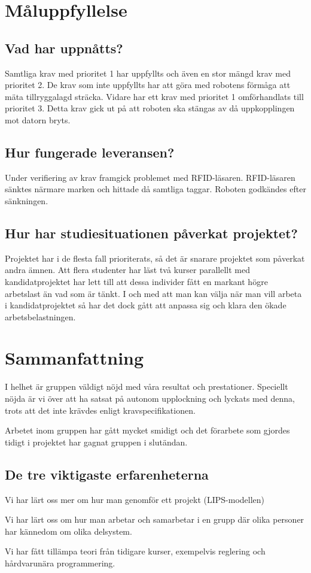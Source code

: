 \documentclass[a4paper,12pt]{article}
\begin{document}
\section{Måluppfyllelse}
\subsection{Vad har uppnåtts?}
Samtliga krav med prioritet 1 har uppfyllts och även en stor mängd krav med prioritet 2. De krav som inte uppfyllts har att göra med robotens förmåga att mäta tillryggalagd sträcka. Vidare har ett krav med prioritet 1 omförhandlats till prioritet 3. Detta krav gick ut på att roboten ska stängas av då uppkopplingen mot datorn bryts.
\subsection{Hur fungerade leveransen?}
Under verifiering av krav framgick problemet med RFID-läsaren. RFID-läsaren sänktes närmare marken och hittade då samtliga taggar. Roboten godkändes efter sänkningen.
\subsection{Hur har studiesituationen påverkat projektet?}
Projektet har i de flesta fall prioriterats, så det är snarare projektet som påverkat andra ämnen. Att flera studenter har läst två kurser parallellt med kandidatprojektet har lett till att dessa individer fått en markant högre arbetslast än vad som är tänkt. I och med att man kan välja när man vill arbeta i kandidatprojektet så har det dock gått att anpassa sig och klara den ökade arbetsbelastningen.

\section{Sammanfattning}
I helhet är gruppen väldigt nöjd med våra resultat och prestationer. Speciellt nöjda är vi över att ha satsat på autonom upplockning och lyckats med denna, trots att det inte krävdes enligt kravspecifikationen. 

Arbetet inom gruppen har gått mycket smidigt och det förarbete som gjordes tidigt i projektet har gagnat gruppen i slutändan.
\subsection{De tre viktigaste erfarenheterna}
\begin{packed_itemize}
\item Vi har lärt oss mer om hur man genomför ett projekt (LIPS-modellen)
\item Vi har lärt oss om hur man arbetar och samarbetar i en grupp där olika personer har kännedom om olika delsystem.
\item Vi har fått tillämpa teori från tidigare kurser, exempelvis reglering och hårdvarunära programmering.
\end{packed_itemize}
\end{document}
